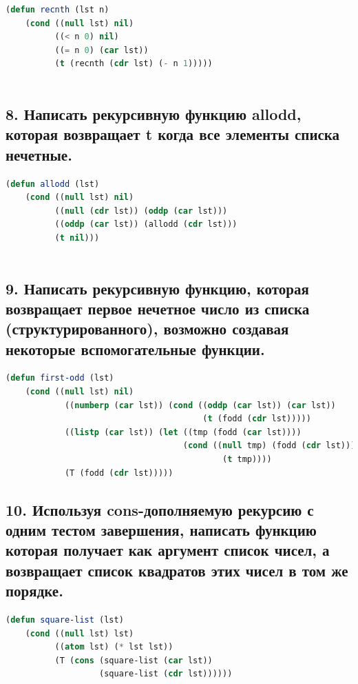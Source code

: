 \documentclass[12pt]{report}
\begin{document}
\begin{lstlisting}[label=6xd, caption=Решение задания №7, language=lisp]	
(defun recnth (lst n) 
	(cond ((null lst) nil) 
		  ((< n 0) nil) 
		  ((= n 0) (car lst)) 
		  (t (recnth (cdr lst) (- n 1)))))
	
\end{lstlisting}

\newpage
\subsection*{8. Написать рекурсивную функцию allodd, которая возвращает t когда все элементы списка
	нечетные.}

\begin{lstlisting}[label=6xd, caption=Решение задания №8, language=lisp]
(defun allodd (lst) 
	(cond ((null lst) nil) 
		  ((null (cdr lst)) (oddp (car lst))) 
		  ((oddp (car lst)) (allodd (cdr lst))) 
		  (t nil)))
	
\end{lstlisting}

\subsection*{9. Написать рекурсивную функцию, которая возвращает первое нечетное число из списка
	(структурированного), возможно создавая некоторые вспомогательные функции.}

\begin{lstlisting}[label=6xd, caption=Решение задания №9, language=lisp]
(defun first-odd (lst)
	(cond ((null lst) nil) 
			((numberp (car lst)) (cond ((oddp (car lst)) (car lst)) 
										(t (fodd (cdr lst)))))
			((listp (car lst)) (let ((tmp (fodd (car lst)))) 
									(cond ((null tmp) (fodd (cdr lst))) 
											(t tmp))))
			(T (fodd (cdr lst)))))

\end{lstlisting}

\subsection*{10. Используя cons-дополняемую рекурсию с одним тестом завершения,
	написать функцию которая получает как аргумент список чисел, а возвращает список
	квадратов этих чисел в том же порядке.}

\begin{lstlisting}[label=6xd, caption=Решение задания №10, language=lisp]
(defun square-list (lst)
	(cond ((null lst) lst)
		  ((atom lst) (* lst lst))
		  (T (cons (square-list (car lst))
				   (square-list (cdr lst))))))
	
\end{lstlisting}
\end{document}
